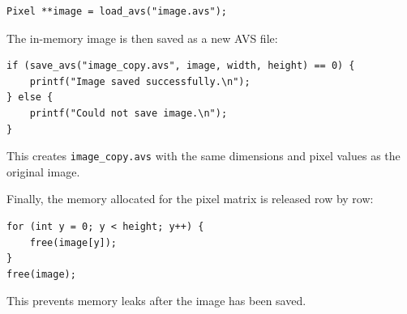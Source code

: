 \documentclass{article}
\begin{document}
\begin{lstlisting}
Pixel **image = load_avs("image.avs");
\end{lstlisting}

The in-memory image is then saved as a new AVS file:

\begin{lstlisting}
if (save_avs("image_copy.avs", image, width, height) == 0) {
    printf("Image saved successfully.\n");
} else {
    printf("Could not save image.\n");
}
\end{lstlisting}

This creates \texttt{image\_copy.avs} with the same dimensions and pixel values
as the original image.

Finally, the memory allocated for the pixel matrix is released row by row:

\begin{lstlisting}
for (int y = 0; y < height; y++) {
    free(image[y]);
}
free(image);
\end{lstlisting}

This prevents memory leaks after the image has been saved.





\end{document}
